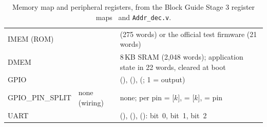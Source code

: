 \begin{table}[H]
\caption[Memory map and peripheral registers]{Memory map and peripheral registers, from the Block Guide Stage 3 register maps~\cite{blockguide} and \texttt{Addr\_dec.v}.}
\label{tab:regmap}
{\tablestyle
\begin{tabularx}{\linewidth}{@{}P{27mm}P{27mm}L@{}}
\toprule
{} &  & \\
\midrule
IMEM (ROM) &  &  (275 words) or the official test firmware (21 words)\\
DMEM &  & 8\,KB SRAM (2,048 words); application state in 22 words, cleared at boot\\
GPIO &  &  (),  (),  (; 1 = output)\\
GPIO\_PIN\_SPLIT & none (wiring) & none; per pin  = [$k$],  = [$k$],  = pin\\
UART &  &  (),  (),  ():  bit~0,  bit~1,  bit~2\\
\bottomrule
\end{tabularx}}
\end{table}
